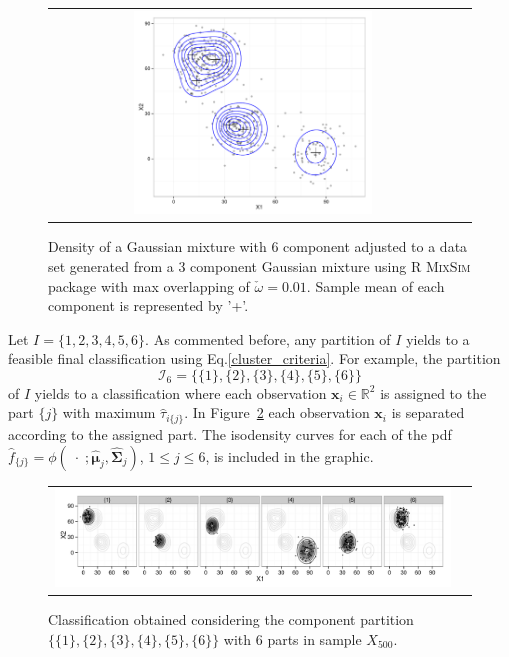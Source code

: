 \documentclass[10pt, a4paper]{article}
\newcommand{\m}[1]{\boldsymbol{#1}}
\begin{document}
\begin{spacing}{1.9}
\begin{figure}[thbp]
\begin{center}
\begin{tabular}{cc}
  \includegraphics[trim=0cm 0cm 0cm 0cm,width=0.6\textwidth]{partition-example-mixture.pdf} \\
 \end{tabular}
 \caption{Density of a Gaussian mixture with 6 component adjusted to a data set generated from a 3 component Gaussian mixture using R \textsc{MixSim} package with max overlapping of $\check{\omega} = 0.01$. Sample mean of each component is represented by '+'.}\label{ex_mixture}
\end{center}
\end{figure}

Let $I = \{1,2,3,4,5,6\}$. As commented before, any partition of $I$ yields to a feasible final classification using Eq.\ref{cluster_criteria}. For example, the partition
\[
\mathcal{I}_6 = \{\{1\},\{2\},\{3\},\{4\},\{5\},\{6\}\}
\]
of $I$ yields to a classification where each observation $\m x_i \in \mathbb{R}^2$ is  assigned to the part $\{j\}$ with maximum $\hat{\tau}_{i\{j\}}$. In Figure~\ref{ex_part6} each observation $\m x_i$ is separated according to the assigned part. The isodensity curves for each of the pdf $\hat{f}_{\{j\}} = \phi(\;\cdot\; ; \hat{\m\mu}_j, \hat{\m\Sigma}_j)$, $1\leq j \leq 6$, is included in the graphic.

\begin{figure}[!h]
\begin{center}
\begin{tabular}{cc}
  \includegraphics[trim=0cm 0cm 0cm 0cm,width=\textwidth]{partition-example-part6.pdf} \\
 \end{tabular}
 \caption{Classification obtained considering the component partition $\{ \{1\}, \{2\}, \{3\}, \{4\}, \{5\}, \{6\} \}$ with 6 parts in sample $X_{500}$.}\label{ex_part6}
\end{center}
\end{figure}


\end{spacing}
\end{document}
